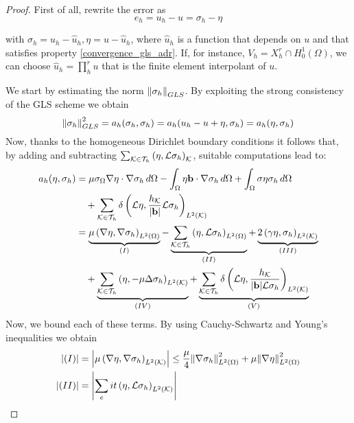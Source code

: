 \begin{proof}
    First of all, rewrite the error as 
    \begin{equation}
        e_h = u_h - u = \sigma_h - \eta
        \label{error_rewrite_adr}
    \end{equation}
    
    with \(\sigma_h = u_h - \hat{u}_h, \eta = u - \hat{u}_h\), where \(\hat{u}_h\) is a function that depends on \(u\) and that satisfies property \eqref{convergence_gls_adr}. If, for instance, \(V_h = X_h^r \cap H^1_0(\Omega)\), we can choose \(\hat{u}_h = \prod_{h}^{r} u\) that is the finite element interpolant of \(u\). 

    We start by estimating the norm \(\norm{\sigma_h}_{GLS}\). By exploiting the strong consistency of the GLS scheme we obtain 
    \[
        \norm{\sigma_h}^2_{GLS} = a_h(\sigma_h, \sigma_h) = a_h(u_h - u +\eta, \sigma_h) = a_h(\eta, \sigma_h)
    \]
    Now, thanks to the homogeneous Dirichlet boundary conditions it follows that, by adding and subtracting \(\sum_{{\mathcal{K}\in\mathcal{T}_h}}\left(\eta, \mathcal{L}\sigma_h\right)_{\mathcal{K}}\), suitable computations lead to:
    \begin{align*}
        a_h(\eta, \sigma_h) &= \mu \sigma_\Omega \nabla \eta \cdot \nabla \sigma_h \, d\Omega - \int_\Omega \eta \textbf{b} \cdot \nabla \sigma_h \, d\Omega + \int_\Omega \sigma \eta \sigma_h \, d\Omega \\
        & \quad + \sum_{\mathcal{K}\in\mathcal{T}_h} \delta \left( \mathcal{L}\eta, \frac{h_{\mathcal{K}}}{\abs{\textbf{b}}}\mathcal{L}\sigma_h \right)_{L^2(\mathcal{K})} \\
        &= \underbrace{\mu\left( \nabla \eta, \nabla \sigma_h \right)_{L^2(\Omega)}}_{(I)} - \underbrace{\sum_{\mathcal{K}\in\mathcal{T}_h} \left(\eta, \mathcal{L}\sigma_h\right)_{L^2(\Omega)}}_{(II)} + \underbrace{2\left( \gamma \eta, \sigma_h \right)_{L^2(\mathcal{K})}}_{(III)} \\
        &\quad + \underbrace{\sum_{\mathcal{K}\in\mathcal{T}_h} \left( \eta, -\mu\Delta \sigma_h \right)_{L^2(\mathcal{K})}}_{(IV)} + \underbrace{\sum_{\mathcal{K}\in\mathcal{T}_h} \delta \left( \mathcal{L}\eta, \frac{h_{\mathcal{K}}}{\abs{\textbf{b}}\mathcal{L}\sigma_h} \right)_{L^2(\mathcal{K})}}_{(V)} 
    \end{align*}
    Now, we bound each of these terms. By using Cauchy-Schwartz and Young's inequalities we obtain 
    \begin{align*}
        \abs{(I)} &= \abs{\mu\left( \grad \eta, \grad \sigma_h \right)_{L^2(\element)}} \leq \frac{\mu}{4} \ltwonorm{\grad \sigma_h}^2 + \mu \ltwonorm{\grad \eta}^2 \\
        \abs{(II)} &= \abs{\sum_eit \left( \eta, \mathcal{L}\sigma_h \right)_{L^2(\element)}} \\

\end{align*}
\end{proof}
